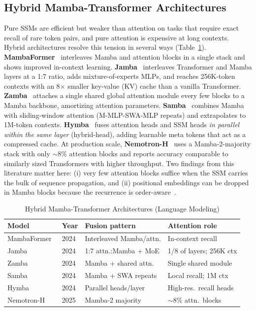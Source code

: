\documentclass[conference]{IEEEtran}
\begin{document}
\subsection{Hybrid Mamba-Transformer Architectures}
Pure SSMs are efficient but weaker than attention on tasks that require
exact recall of rare token pairs, and pure attention is expensive at long
contexts. Hybrid architectures resolve this tension in several ways
(Table~\ref{tab:hybrid}). \textbf{MambaFormer}~\cite{park2024mambaformer}
interleaves Mamba and attention blocks in a single stack and shows improved
in-context learning. \textbf{Jamba}~\cite{lieber2024jamba} interleaves
Transformer and Mamba layers at a 1:7 ratio, adds mixture-of-experts MLPs,
and reaches 256K-token contexts with an 8$\times$ smaller key-value (KV)
cache than a vanilla Transformer. \textbf{Zamba}~\cite{glorioso2024zamba}
attaches a single shared global attention module every few blocks to a Mamba
backbone, amortizing attention parameters. \textbf{Samba}~\cite{ren2024samba}
combines Mamba with sliding-window attention (M-MLP-SWA-MLP repeats) and
extrapolates to 1M-token contexts. \textbf{Hymba}~\cite{dong2024hymba} fuses
attention heads and SSM heads \emph{in parallel within the same layer}
(hybrid-head), adding learnable meta tokens that act as a compressed cache.
At production scale, \textbf{Nemotron-H}~\cite{nvidia2025nemotronh} uses a
Mamba-2-majority stack with only $\sim$8\% attention blocks and reports
accuracy comparable to similarly sized Transformers with higher throughput.
Two findings from this literature matter here: (i) very few attention blocks
suffice when the SSM carries the bulk of sequence propagation, and (ii)
positional embeddings can be dropped in Mamba blocks because the recurrence
is order-aware~\cite{lieber2024jamba,nvidia2025nemotronh}.

\begin{table}[t]
\centering
\caption{Hybrid Mamba-Transformer Architectures (Language Modeling)}
\label{tab:hybrid}
\scriptsize
\begin{tabular}{@{}llll@{}}
\toprule
\textbf{Model} & \textbf{Year} & \textbf{Fusion pattern} & \textbf{Attention role} \\
\midrule
MambaFormer~\cite{park2024mambaformer} & 2024 & Interleaved Mamba/attn. & In-context recall \\
Jamba~\cite{lieber2024jamba} & 2024 & 1:7 attn.:Mamba + MoE & 1/8 of layers; 256K ctx \\
Zamba~\cite{glorioso2024zamba} & 2024 & Mamba + shared attn. & Single shared module \\
Samba~\cite{ren2024samba} & 2024 & Mamba + SWA repeats & Local recall; 1M ctx \\
Hymba~\cite{dong2024hymba} & 2024 & Parallel heads/layer & High-res.\ recall heads \\
Nemotron-H~\cite{nvidia2025nemotronh} & 2025 & Mamba-2 majority & $\sim$8\% attn.\ blocks \\
\bottomrule
\end{tabular}
\end{table}
\end{document}
